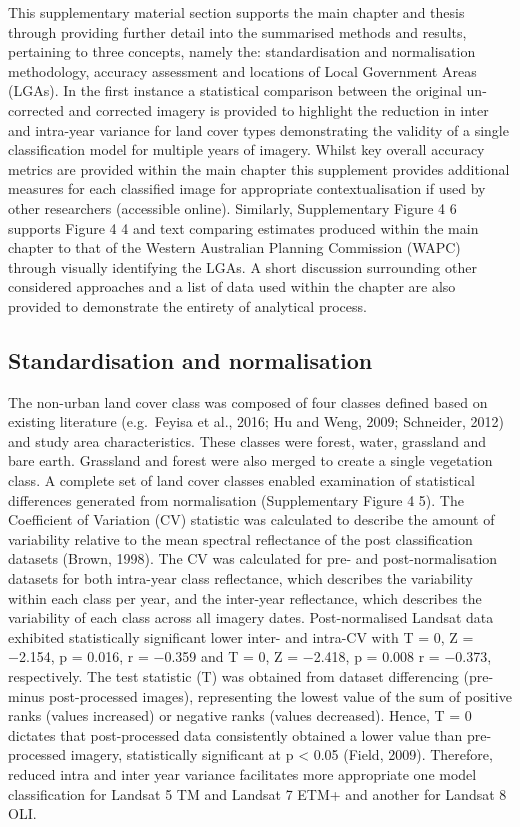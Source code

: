 \documentclass[]{book}
\begin{document}
This supplementary material section supports the main chapter and thesis
through providing further detail into the summarised methods and
results, pertaining to three concepts, namely the: standardisation and
normalisation methodology, accuracy assessment and locations of Local
Government Areas (LGAs). In the first instance a statistical comparison
between the original un-corrected and corrected imagery is provided to
highlight the reduction in inter and intra-year variance for land cover
types demonstrating the validity of a single classification model for
multiple years of imagery. Whilst key overall accuracy metrics are
provided within the main chapter this supplement provides additional
measures for each classified image for appropriate contextualisation if
used by other researchers (accessible online). Similarly, Supplementary
Figure 4 6 supports Figure 4 4 and text comparing estimates produced
within the main chapter to that of the Western Australian Planning
Commission (WAPC) through visually identifying the LGAs. A short
discussion surrounding other considered approaches and a list of data
used within the chapter are also provided to demonstrate the entirety of
analytical process.

\subsection{Standardisation and
normalisation}\label{standardisation-and-normalisation}

The non-urban land cover class was composed of four classes defined
based on existing literature (e.g.~Feyisa et al., 2016; Hu and Weng,
2009; Schneider, 2012) and study area characteristics. These classes
were forest, water, grassland and bare earth. Grassland and forest were
also merged to create a single vegetation class. A complete set of land
cover classes enabled examination of statistical differences generated
from normalisation (Supplementary Figure 4 5). The Coefficient of
Variation (CV) statistic was calculated to describe the amount of
variability relative to the mean spectral reflectance of the post
classification datasets (Brown, 1998). The CV was calculated for pre-
and post-normalisation datasets for both intra-year class reflectance,
which describes the variability within each class per year, and the
inter-year reflectance, which describes the variability of each class
across all imagery dates. Post-normalised Landsat data exhibited
statistically significant lower inter- and intra-CV with T = 0, Z =
−2.154, p = 0.016, r = −0.359 and T = 0, Z = −2.418, p = 0.008 r =
−0.373, respectively. The test statistic (T) was obtained from dataset
differencing (pre- minus post-processed images), representing the lowest
value of the sum of positive ranks (values increased) or negative ranks
(values decreased). Hence, T = 0 dictates that post-processed data
consistently obtained a lower value than pre-processed imagery,
statistically significant at p \textless{} 0.05 (Field, 2009).
Therefore, reduced intra and inter year variance facilitates more
appropriate one model classification for Landsat 5 TM and Landsat 7 ETM+
and another for Landsat 8 OLI.
\end{document}
